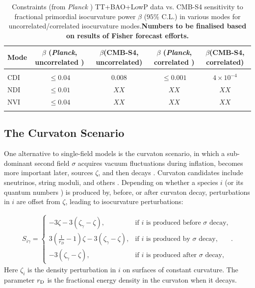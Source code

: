 \begin{table}
\begin{center}
\begin{tabular}
{lcccc}\hline \hline {\rm Mode} &  $ \beta $ (\emph{Planck}, uncorrelated )&$ \beta$(CMB-S4, uncorrelated)&  $ \beta $ (\emph{Planck}, correlated )&$ \beta$(CMB-S4, correlated)\\ 
\hline \\
CDI & $\leq 0.04$&$0.008$&$\leq0.001$&$4\times 10^{-4}$\\
NDI &  $\leq 0.01$ &$XX$&$XX$&$XX$\\
NVI &  $\leq 0.04$&$XX$&$XX$&$XX$\\
\\ \hline \hline 
\end{tabular}
\caption{Constraints (from \emph{Planck} \cite{Ade:2015lrj}) TT+BAO+LowP data vs. CMB-S4 sensitivity to fractional primordial isocurvature power $\beta$ ($95\%$ C.L.) in various modes for uncorrelated/correlated isocurvature modes.\textbf{Numbers to be finalised based on results of Fisher forecast efforts.}
\label{table:fisher_model_independent}}
\end{center}
\end{table} 

\subsection{The Curvaton Scenario}
One alternative to single-field models is the curvaton scenario, in which a sub-dominant second field $\sigma$ acquires vacuum fluctuations during inflation, becomes more important later, sources $\zeta$, and then decays \cite{Mollerach:1989hu,Mukhanov:1990me,Moroi:2001ct,Lyth:2001nq,Lyth:2002my}. Curvaton candidates include sneutrinos, string moduli, and others \cite{Postma:2002et,Kasuya:2003va,Ikegami:2004ve,Mazumdar:2004qv,Allahverdi:2006dr,Papantonopoulos:2006xi,Mazumdar:2010sa,Mazumdar:2011xe}. Depending on whether a species $i$ (or its quantum numbers ) is produced by, before, or after curvaton decay, perturbations in $i$ are offset from $\zeta$, leading to isocurvature perturbations: \cite{Lyth:2001nq,Lyth:2002my,Gordon:2002gv}

\begin{eqnarray}
S_{i \gamma}=\left\{\begin{array}{ll}-3\zeta-3(\zeta_{\gamma}-\zeta),&\mbox{if $i$ is produced before $\sigma$ decay,}\\3\left(\frac{1}{r_{D}}-1\right)\zeta-3(\zeta_{\gamma}-\zeta),&\mbox{if $i$ is produced by $\sigma$ decay},\\ -3(\zeta_\gamma-\zeta),&\mbox{if $i$ is produced after $\sigma$ decay},\end{array}\right.\label{eq:strew}.
\end{eqnarray} Here $\zeta_{i}$ is the density perturbation in $i$ on surfaces of constant curvature. The parameter $r_{\rm D}$ is the fractional energy density in the curvaton when it decays. 

